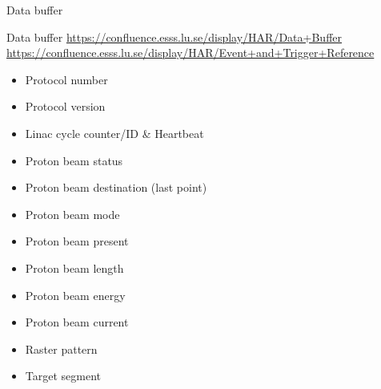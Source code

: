 \documentclass[
  9pt
  , table
  , ignorenonframetext
]{beamer}
\begin{document}
%
%


\begin{frame}{Data buffer}
  \begin{block}{Data buffer}
    \url{https://confluence.esss.lu.se/display/HAR/Data+Buffer}
    \url{https://confluence.esss.lu.se/display/HAR/Event+and+Trigger+Reference}
    \begin{itemize}
      \item Protocol number
      \item Protocol version
      \item Linac cycle counter/ID & Heartbeat
      \item Proton beam status
      \item Proton beam destination (last point)
      \item Proton beam mode
      \item Proton beam present
      \item Proton beam length
      \item Proton beam energy
      \item Proton beam current
      \item Raster pattern
      \item Target segment
\end{itemize}
  \end{block}
\end{frame}
\end{document}
